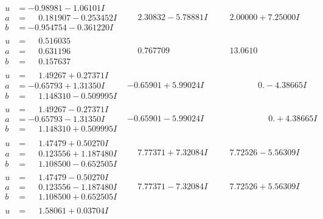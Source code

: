 \documentclass[1p]{elsarticle_modified}
\theoremstyle{definition}
\begin{document}
$$\begin{array}{c|c|c}
\begin{aligned}
u &= -0.98981 - 1.06101 I \\
a &= \phantom{-}0.181907 - 0.253452 I \\
b &= -0.954754 - 0.361220 I\end{aligned}
 & \phantom{-}2.30832 - 5.78881 I & \phantom{-}2.00000 + 7.25000 I \\ \hline\begin{aligned}
u &= \phantom{-}0.516035\phantom{ +0.000000I} \\
a &= \phantom{-}0.631196\phantom{ +0.000000I} \\
b &= \phantom{-}0.157637\phantom{ +0.000000I}\end{aligned}
 & \phantom{-}0.767709\phantom{ +0.000000I} & \phantom{-}13.0610\phantom{ +0.000000I} \\ \hline\begin{aligned}
u &= \phantom{-}1.49267 + 0.27371 I \\
a &= -0.65793 + 1.31350 I \\
b &= \phantom{-}1.148310 - 0.509995 I\end{aligned}
 & -0.65901 + 5.99024 I & \phantom{-0.000000 } 0. - 4.38665 I \\ \hline\begin{aligned}
u &= \phantom{-}1.49267 - 0.27371 I \\
a &= -0.65793 - 1.31350 I \\
b &= \phantom{-}1.148310 + 0.509995 I\end{aligned}
 & -0.65901 - 5.99024 I & \phantom{-0.000000 -}0. + 4.38665 I \\ \hline\begin{aligned}
u &= \phantom{-}1.47479 + 0.50270 I \\
a &= \phantom{-}0.123556 + 1.187480 I \\
b &= \phantom{-}1.108500 - 0.652505 I\end{aligned}
 & \phantom{-}7.77371 + 7.32084 I & \phantom{-}7.72526 - 5.56309 I \\ \hline\begin{aligned}
u &= \phantom{-}1.47479 - 0.50270 I \\
a &= \phantom{-}0.123556 - 1.187480 I \\
b &= \phantom{-}1.108500 + 0.652505 I\end{aligned}
 & \phantom{-}7.77371 - 7.32084 I & \phantom{-}7.72526 + 5.56309 I \\ \hline\begin{aligned}
u &= \phantom{-}1.58061 + 0.03704 I \\

\end{aligned}
\end{array}$$
\end{document}
